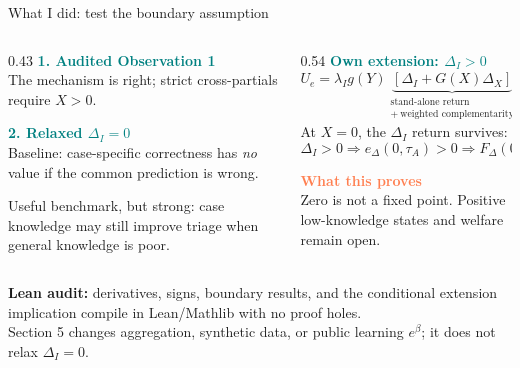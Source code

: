 \documentclass[aspectratio=169,11pt]{beamer}
\newcommand{\key}[1]{\textcolor{Teal}{\textbf{#1}}}
\newcommand{\caveat}[1]{\textcolor{Coral}{\textbf{#1}}}
\begin{document}
\begin{frame}{What I did: test the boundary assumption}
\small
\begin{columns}[T,totalwidth=\textwidth]
\begin{column}{0.43\textwidth}
  \key{1. Audited Observation 1}\\[-0.01cm]
  The mechanism is right; strict cross-partials require \(X>0\).

  \vspace{0.25cm}
  \key{2. Relaxed \(\Delta_I=0\)}\\[-0.02cm]
  Baseline: case-specific correctness has \emph{no} value if the common
  prediction is wrong.

  \vspace{0.10cm}
  Useful benchmark, but strong: case knowledge may still improve triage when
  general knowledge is poor.
\end{column}
\begin{column}{0.54\textwidth}
  \key{Own extension: \(\Delta_I>0\)}
  {\small
  \[
  U_e=\lambda_Ig(Y)
  \underbrace{[\Delta_I+G(X)\Delta_X]}_{\substack{\text{stand-alone return}\\+\ \text{weighted complementarity}}}
  -e^{1/\varepsilon}.
  \]
  }
  At \(X=0\), the \(\Delta_I\) return survives:
  \[
  \Delta_I>0
  \Rightarrow e_\Delta(0,\tau_A)>0
  \Rightarrow F_\Delta(0)>0.
  \]

  \caveat{What this proves}\\[-0.02cm]
  Zero is not a fixed point. Positive low-knowledge states and welfare remain open.
\end{column}
\end{columns}

\vfill
{\scriptsize
\textbf{Lean audit:} derivatives, signs, boundary results, and the conditional
extension implication compile in Lean/Mathlib with no proof holes.\\[-0.02cm]
Section 5 changes aggregation, synthetic data, or public learning
\(e^\beta\); it does not relax \(\Delta_I=0\).}
\end{frame}
\end{document}
